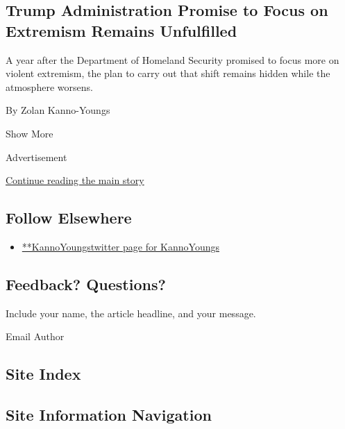 \begin{enumerate}
  \hypertarget{trump-administration-promise-to-focus-on-extremism-remains-unfulfilled}{%
  \subsection{Trump Administration Promise to Focus on Extremism Remains
  Unfulfilled}\label{trump-administration-promise-to-focus-on-extremism-remains-unfulfilled}}

  A year after the Department of Homeland Security promised to focus
  more on violent extremism, the plan to carry out that shift remains
  hidden while the atmosphere worsens.

  By Zolan Kanno-Youngs
\end{enumerate}

Show More

Advertisement

\protect\hyperlink{after-mid2}{Continue reading the main story}

\hypertarget{follow-elsewhere}{%
\subsection{Follow Elsewhere}\label{follow-elsewhere}}

\begin{itemize}
\tightlist
\item
  \href{https://twitter.com/KannoYoungs}{**KannoYoungstwitter page for
  KannoYoungs}
\end{itemize}

\hypertarget{feedback-questions}{%
\subsection{Feedback? Questions?}\label{feedback-questions}}

Include your name, the article headline, and your message.

Email Author

\hypertarget{site-index}{%
\subsection{Site Index}\label{site-index}}

\hypertarget{site-information-navigation}{%
\subsection{Site Information
Navigation}\label{site-information-navigation}}

